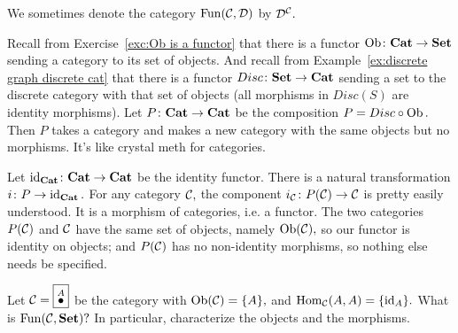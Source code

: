 \documentclass[../main/CT4S-EN-RU]{subfiles}
\begin{document}
\begin{proofRUS}
\end{proofRUS}

\begin{notationENG}
We sometimes denote the category $\operatorname{Fun}(\mathcal{C},\mathcal{D})$ by $\mathcal{D}^\mathcal{C}.$ 
\end{notationENG}

\begin{notationRUS}
\end{notationRUS}

\begin{exampleENG}
Recall from Exercise~\ref{exc:Ob is a functor} that there is a functor $\operatorname{Ob}\colon{\mathbf{Cat}}\rightarrow{\mathbf{Set}}$ sending a category to its set of objects. And recall from Example~\ref{ex:discrete graph discrete cat} that there is a functor $Disc\colon{\mathbf{Set}}\rightarrow{\mathbf{Cat}}$ sending a set to the discrete category with that set of objects (all morphisms in $Disc(S)$ are identity morphisms). Let $P\colon{\mathbf{Cat}}\rightarrow{\mathbf{Cat}}$ be the composition $P=Disc\circ\operatorname{Ob}.$ Then $P$ takes a category and makes a new category with the same objects but no morphisms. It's like crystal meth for categories.

Let $\operatorname{id}_{\mathbf{Cat}}\colon{\mathbf{Cat}}\rightarrow{\mathbf{Cat}}$ be the identity functor. There is a natural transformation $i\colon P\rightarrow\operatorname{id}_{\mathbf{Cat}}.$ For any category $\mathcal{C},$ the component $i_\mathcal{C}\colon P(\mathcal{C})\rightarrow\mathcal{C}$ is pretty easily understood. It is a morphism of categories, i.e. a functor. The two categories $P(\mathcal{C})$ and $\mathcal{C}$ have the same set of objects, namely $\operatorname{Ob}(\mathcal{C}),$ so our functor is identity on objects; and $P(\mathcal{C})$ has no non-identity morphisms, so nothing else needs be specified.
\end{exampleENG}

\begin{exampleRUS}
\end{exampleRUS}

\begin{exerciseENG}
Let $\mathcal{C}=\fbox{$\stackrel{A}{\bullet}$}$ be the category with $\operatorname{Ob}(\mathcal{C})=\{A\},$ and $\operatorname{Hom}_\mathcal{C}(A,A)=\{\operatorname{id}_A\}.$ What is $\operatorname{Fun}(\mathcal{C},{\mathbf{Set}})?$ In particular, characterize the objects and the morphisms.
\end{exerciseENG}

\begin{exerciseRUS}
\end{exerciseRUS}
\end{document}
